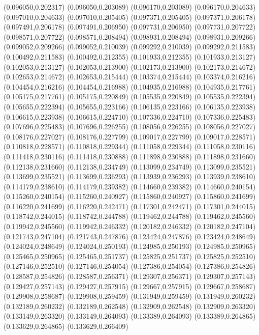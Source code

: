 (0.096050,0.202317)
(0.096050,0.203089)
(0.096170,0.203089)
(0.096170,0.204633)
(0.097010,0.204633)
(0.097010,0.205405)
(0.097371,0.205405)
(0.097371,0.206178)
(0.097491,0.206178)
(0.097491,0.206950)
(0.097731,0.206950)
(0.097731,0.207722)
(0.098571,0.207722)
(0.098571,0.208494)
(0.098931,0.208494)
(0.098931,0.209266)
(0.099052,0.209266)
(0.099052,0.210039)
(0.099292,0.210039)
(0.099292,0.211583)
(0.100492,0.211583)
(0.100492,0.212355)
(0.101933,0.212355)
(0.101933,0.213127)
(0.102053,0.213127)
(0.102053,0.213900)
(0.102173,0.213900)
(0.102173,0.214672)
(0.102653,0.214672)
(0.102653,0.215444)
(0.103374,0.215444)
(0.103374,0.216216)
(0.104454,0.216216)
(0.104454,0.216988)
(0.104935,0.216988)
(0.104935,0.217761)
(0.105175,0.217761)
(0.105175,0.220849)
(0.105535,0.220849)
(0.105535,0.222394)
(0.105655,0.222394)
(0.105655,0.223166)
(0.106135,0.223166)
(0.106135,0.223938)
(0.106615,0.223938)
(0.106615,0.224710)
(0.107336,0.224710)
(0.107336,0.225483)
(0.107696,0.225483)
(0.107696,0.226255)
(0.108056,0.226255)
(0.108056,0.227027)
(0.108176,0.227027)
(0.108176,0.227799)
(0.109017,0.227799)
(0.109017,0.228571)
(0.110818,0.228571)
(0.110818,0.229344)
(0.111058,0.229344)
(0.111058,0.230116)
(0.111418,0.230116)
(0.111418,0.230888)
(0.111898,0.230888)
(0.111898,0.231660)
(0.112138,0.231660)
(0.112138,0.234749)
(0.113099,0.234749)
(0.113099,0.235521)
(0.113699,0.235521)
(0.113699,0.236293)
(0.113939,0.236293)
(0.113939,0.238610)
(0.114179,0.238610)
(0.114179,0.239382)
(0.114660,0.239382)
(0.114660,0.240154)
(0.115260,0.240154)
(0.115260,0.240927)
(0.115860,0.240927)
(0.115860,0.241699)
(0.116220,0.241699)
(0.116220,0.242471)
(0.117301,0.242471)
(0.117301,0.244015)
(0.118742,0.244015)
(0.118742,0.244788)
(0.119462,0.244788)
(0.119462,0.245560)
(0.119942,0.245560)
(0.119942,0.246332)
(0.120182,0.246332)
(0.120182,0.247104)
(0.121743,0.247104)
(0.121743,0.247876)
(0.123424,0.247876)
(0.123424,0.248649)
(0.124024,0.248649)
(0.124024,0.250193)
(0.124985,0.250193)
(0.124985,0.250965)
(0.125465,0.250965)
(0.125465,0.251737)
(0.125825,0.251737)
(0.125825,0.252510)
(0.127146,0.252510)
(0.127146,0.254054)
(0.127386,0.254054)
(0.127386,0.254826)
(0.128587,0.254826)
(0.128587,0.256371)
(0.129307,0.256371)
(0.129307,0.257143)
(0.129427,0.257143)
(0.129427,0.257915)
(0.129667,0.257915)
(0.129667,0.258687)
(0.129908,0.258687)
(0.129908,0.259459)
(0.131949,0.259459)
(0.131949,0.260232)
(0.132189,0.260232)
(0.132189,0.262548)
(0.132909,0.262548)
(0.132909,0.263320)
(0.133149,0.263320)
(0.133149,0.264093)
(0.133389,0.264093)
(0.133389,0.264865)
(0.133629,0.264865)
(0.133629,0.266409)
